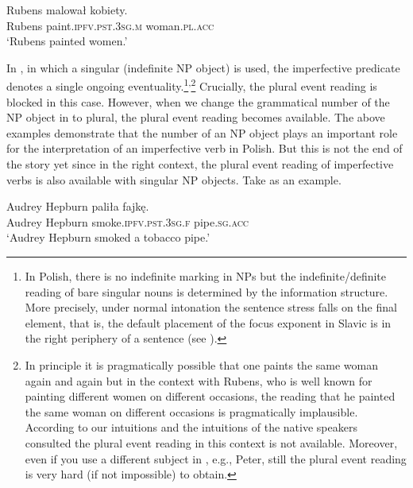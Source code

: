 \documentclass[output=paper]{langscibook}
\begin{document}
\ea
\gll Rubens malował kobiety.\label{jan-bla:fansb:kb:ex5}\\  
     Rubens paint.\textsc{ipfv}.\textsc{pst}.\textsc{3sg}.\textsc{m} woman.\textsc{pl}.\textsc{acc}\\
\glt ‘Rubens painted women.’
\z

\noindent In , in which a singular (indefinite NP object) is used, the imperfective predicate denotes a single ongoing eventuality.\footnote{In Polish, there is no indefinite marking in NPs but the indefinite/definite reading of bare singular nouns is determined by the information structure. More precisely, under normal intonation the sentence stress falls on the final element, that is, the default placement of the focus exponent in Slavic is in the right periphery of a sentence (see \citealt{Junghanns2002}).}\textsuperscript{,}\footnote{In principle it is pragmatically possible that one paints the same woman again and again but in the context with Rubens, who is well known for painting different women on different occasions, the reading that he painted the same woman on different occasions is pragmatically implausible. According to our intuitions and the intuitions of the native speakers consulted the plural event reading in this context is not available. Moreover, even if you use a different subject in , e.g., Peter, still the plural event reading is very hard (if not impossible) to obtain.} Crucially, the plural event reading is blocked in this case. However, when we change the grammatical number of the NP object in  to plural, the plural event reading becomes available. The above examples demonstrate that the number of an NP object plays an important role for the interpretation of an imperfective verb in Polish. But this is not the end of the story yet since in the right context, the plural event reading of imperfective verbs is also available with singular NP objects. Take  as an example.

\ea
\gll Audrey Hepburn paliła fajkę.\label{jan-bla:fansb:kb:ex6}\\  
     Audrey Hepburn smoke.\textsc{ipfv}.\textsc{pst}.\textsc{3sg}.\textsc{f} pipe.\textsc{sg}.\textsc{acc}\\
\glt ‘Audrey Hepburn smoked a tobacco pipe.’
\z
\end{document}
